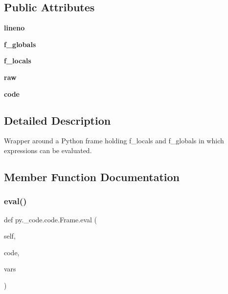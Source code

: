\subsection*{Public Attributes}
\begin{DoxyCompactItemize}
\item 
\mbox{\label{classpy_1_1__code_1_1code_1_1_frame_ac50fbe47104237f5655837dd440b50df}} 
{\bfseries lineno}
\item 
\mbox{\label{classpy_1_1__code_1_1code_1_1_frame_ab7223d975a2258d8fdff2b921eda5721}} 
{\bfseries f\+\_\+globals}
\item 
\mbox{\label{classpy_1_1__code_1_1code_1_1_frame_a8cc632974d8bf9f630307c0a9cc762fb}} 
{\bfseries f\+\_\+locals}
\item 
\mbox{\label{classpy_1_1__code_1_1code_1_1_frame_a25193c5550e20b71d0b4410762160a76}} 
{\bfseries raw}
\item 
\mbox{\label{classpy_1_1__code_1_1code_1_1_frame_a7cae25e686b21c2eb8eab270bd17300b}} 
{\bfseries code}
\end{DoxyCompactItemize}


\subsection{Detailed Description}
\begin{DoxyVerb}Wrapper around a Python frame holding f_locals and f_globals
in which expressions can be evaluated.\end{DoxyVerb}
 

\subsection{Member Function Documentation}
\mbox{\label{classpy_1_1__code_1_1code_1_1_frame_a150310a7a1ef54e1dccd9e4366ab02bf}} 
\subsubsection{\texorpdfstring{eval()}{eval()}}
{\footnotesize\ttfamily def py.\+\_\+code.\+code.\+Frame.\+eval (\begin{DoxyParamCaption}\item[{}]{self,  }\item[{}]{code,  }\item[{}]{vars }\end{DoxyParamCaption})}

